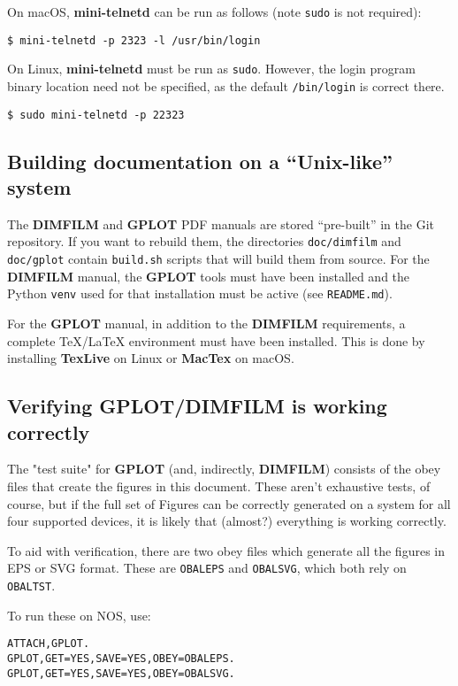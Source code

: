 \documentclass[a4paper,twoside,11pt]{article}
\newcommand{\newpara}{\par\vspace{4mm}\noindent}
\begin{document}
\newpara
On macOS, \textbf{mini-telnetd} can be run as follows (note \texttt{sudo} is not required):
\begin{lstlisting}
$ mini-telnetd -p 2323 -l /usr/bin/login
\end{lstlisting}

\newpara
On Linux, \textbf{mini-telnetd} must be run as \texttt{sudo}. However, the login program binary location need not be specified,
as the default \texttt{/bin/login} is correct there.
\begin{lstlisting}
$ sudo mini-telnetd -p 22323 
\end{lstlisting}

\subsection{Building documentation on a ``Unix-like'' system}
\newpara
The \textbf{DIMFILM} and \textbf{GPLOT} PDF manuals are stored ``pre-built'' in the Git repository. If you want to rebuild them,
the directories \texttt{doc/dimfilm} and \texttt{doc/gplot} contain \texttt{build.sh} scripts that will build them from source. For
the \textbf{DIMFILM} manual, the \textbf{GPLOT} tools must have been installed and
the Python \texttt{venv} used for that installation must be active
(see \texttt{README.md}).

\newpara
For the \textbf{GPLOT} manual, in addition to the \textbf{DIMFILM} requirements, a complete TeX/LaTeX environment
must have been installed. This is done by installing \textbf{TexLive} on Linux or \textbf{MacTex} on macOS.

\subsection{Verifying GPLOT/DIMFILM is working correctly}

The "test suite" for \textbf{GPLOT} (and, indirectly, \textbf{DIMFILM}) consists of the obey files that
create the figures in this document. These aren't exhaustive tests, of course, but
if the full set of Figures can be correctly generated on a system for all four
supported devices, it is likely that (almost?) everything is working correctly.

\newpara
To aid with verification, there are two obey files which generate all the figures
in EPS or SVG format. These are \texttt{OBALEPS} and \texttt{OBALSVG},
which both rely on \texttt{OBALTST}.

\newpara
To run these on NOS, use:
\begin{lstlisting}
ATTACH,GPLOT.
GPLOT,GET=YES,SAVE=YES,OBEY=OBALEPS.
GPLOT,GET=YES,SAVE=YES,OBEY=OBALSVG.
\end{lstlisting}
\end{document}
